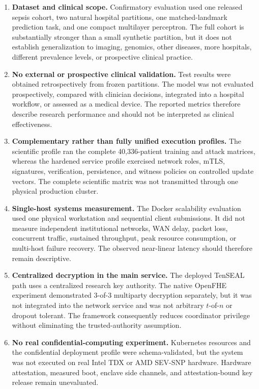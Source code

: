\begin{enumerate}
    \item \textbf{Dataset and clinical scope.} Confirmatory evaluation used one released sepsis cohort, two natural hospital partitions, one matched-landmark prediction task, and one compact multilayer perceptron. The full cohort is substantially stronger than a small synthetic partition, but it does not establish generalization to imaging, genomics, other diseases, more hospitals, different prevalence levels, or prospective clinical practice.

    \item \textbf{No external or prospective clinical validation.} Test results were obtained retrospectively from frozen partitions. The model was not evaluated prospectively, compared with clinician decisions, integrated into a hospital workflow, or assessed as a medical device. The reported metrics therefore describe research performance and should not be interpreted as clinical effectiveness.

    \item \textbf{Complementary rather than fully unified execution profiles.} The scientific profile ran the complete 40,336-patient training and attack matrices, whereas the hardened service profile exercised network roles, mTLS, signatures, verification, persistence, and witness policies on controlled update vectors. The complete scientific matrix was not transmitted through one physical production cluster.

    \item \textbf{Single-host systems measurement.} The Docker scalability evaluation used one physical workstation and sequential client submissions. It did not measure independent institutional networks, WAN delay, packet loss, concurrent traffic, sustained throughput, peak resource consumption, or multi-host failure recovery. The observed near-linear latency should therefore remain descriptive.

    \item \textbf{Centralized decryption in the main service.} The deployed TenSEAL path uses a centralized research key authority. The native OpenFHE experiment demonstrated 3-of-3 multiparty decryption separately, but it was not integrated into the network service and was not arbitrary $t$-of-$n$ or dropout tolerant. The framework consequently reduces coordinator privilege without eliminating the trusted-authority assumption.

    \item \textbf{No real confidential-computing experiment.} Kubernetes resources and the confidential deployment profile were schema-validated, but the system was not executed on real Intel TDX or AMD SEV-SNP hardware. Hardware attestation, measured boot, enclave side channels, and attestation-bound key release remain unevaluated.


\end{enumerate}
